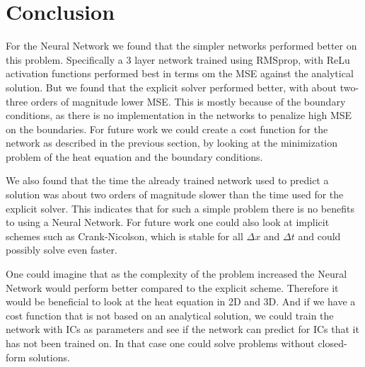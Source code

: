 \section{Conclusion}
\begin{comment}
State your main findings and interpretations. 
Try as far as possible to present perspectives for future work. 
Try to discuss the pros and cons of the methods and possible improvements.
\end{comment}

For the Neural Network we found that the simpler networks performed better on
this problem. Specifically a 3 layer network trained using RMSprop, with ReLu
activation functions performed best in terms om the MSE against the analytical
solution. But we found that the explicit solver performed better, with about
two-three orders of magnitude lower MSE. This is mostly because of the boundary
conditions, as there is no implementation in the networks to penalize high MSE
on the boundaries. For future work we could create a cost function for the
network as described in the previous section, by looking at the minimization
problem of the heat equation and the boundary conditions.

We also found that the time the already trained network used to predict a
solution was about two orders of magnitude slower than the time used for the
explicit solver. This indicates that for such a simple problem there is no
benefits to using a Neural Network. For future work one could also look at
implicit schemes such as Crank-Nicolson, which is stable for all $\Delta x$ and
$\Delta t$ and could possibly solve even faster. 

One could imagine that as the complexity of the problem increased the Neural
Network would perform better compared to the explicit scheme. Therefore it
would be beneficial to look at the heat equation in 2D and 3D. And if we have a
cost function that is not based on an analytical solution, we could train the
network with ICs as parameters and see if the network can predict for ICs that
it has not been trained on. In that case one could solve problems without
closed-form solutions.


